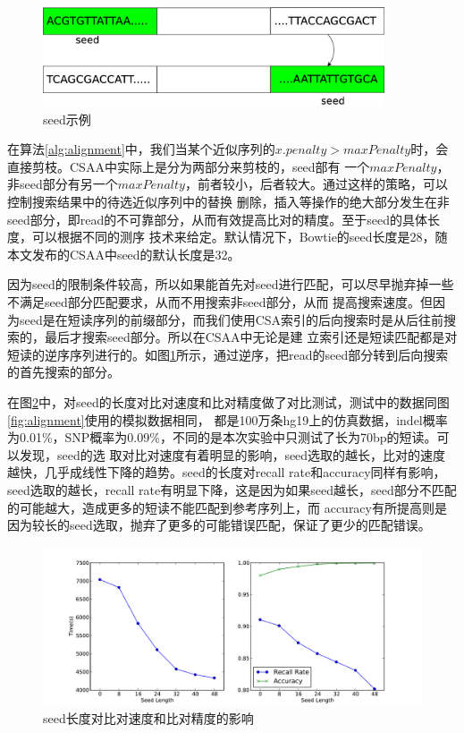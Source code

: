 \documentclass[UTF8,adobefonts]{ctexart}
\begin{document}
\begin{figure}[htbp]
    \centering
    \includegraphics[width=0.9\textwidth]{seed.eps}
    \caption{seed示例} \label{fig:seed}
\end{figure}

在算法\ref{alg:alignment}中，我们当某个近似序列的$x.penalty>maxPenalty$时，会直接剪枝。CSAA中实际上是分为两部分来剪枝的，seed部有
一个$maxPenalty$，非seed部分有另一个$maxPenalty$，前者较小，后者较大。通过这样的策略，可以控制搜索结果中的待选近似序列中的替换
删除，插入等操作的绝大部分发生在非seed部分，即read的不可靠部分，从而有效提高比对的精度。至于seed的具体长度，可以根据不同的测序
技术来给定。默认情况下，Bowtie的seed长度是28，随本文发布的CSAA中seed的默认长度是32。

因为seed的限制条件较高，所以如果能首先对seed进行匹配，可以尽早抛弃掉一些不满足seed部分匹配要求，从而不用搜索非seed部分，从而
提高搜索速度。但因为seed是在短读序列的前缀部分，而我们使用CSA索引的后向搜索时是从后往前搜索的，最后才搜索seed部分。所以在CSAA中无论是建
立索引还是短读匹配都是对短读的逆序序列进行的。如图\ref{fig:seed}所示，通过逆序，把read的seed部分转到后向搜索的首先搜索的部分。

在图\ref{fig:seedaccuracy}中，对seed的长度对比对速度和比对精度做了对比测试，测试中的数据同图\ref{fig:alignment}使用的模拟数据相同，
都是100万条hg19上的仿真数据，indel概率为0.01\%，SNP概率为0.09\%，不同的是本次实验中只测试了长为70bp的短读。可以发现，seed的选
取对比对速度有着明显的影响，seed选取的越长，比对的速度越快，几乎成线性下降的趋势。seed的长度对recall rate和accuracy同样有影响，
seed选取的越长，recall rate有明显下降，这是因为如果seed越长，seed部分不匹配的可能越大，造成更多的短读不能匹配到参考序列上，而
accuracy有所提高则是因为较长的seed选取，抛弃了更多的可能错误匹配，保证了更少的匹配错误。

\begin{figure}[htbp]
    \centering
    \includegraphics[width=1.1\textwidth]{seedaccuracy.pdf}
    \caption{seed长度对比对速度和比对精度的影响} \label{fig:seedaccuracy}
\end{figure}
\end{document}
